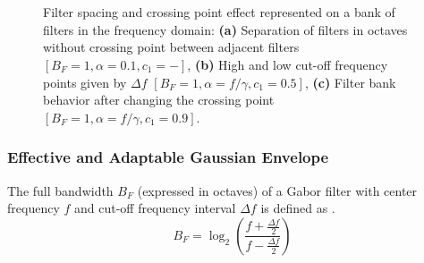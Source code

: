 \documentclass[journal]{IEEEtran}
\newcommand{\captext}[1]{\small{\textbf{\textsf{#1}}}}
\begin{document}
\begin{figure}[!ht]
\centering
     \\
    \\
\caption{Filter spacing and crossing point effect represented on a bank of filters in the frequency domain: \captext{(a)} Separation of filters in octaves without crossing point between adjacent filters $[B_F=1, \alpha=0.1, c_1=-]$, \captext{(b)} High and low cut-off frequency points given by $\Delta f$ $[B_F=1, \alpha=f/\gamma, c_1=0.5]$, \captext{(c)} Filter bank behavior after changing the crossing point $[B_F=1, \alpha=f/\gamma, c_1=0.9]$.}\label{fig:1d_filterbank_spacing}
\end{figure}


\subsubsection{Effective and Adaptable Gaussian Envelope}
The full bandwidth $B_F$ (expressed in octaves) of a Gabor filter with center frequency $f$ and cut-off frequency interval $\Delta f$ is defined as \cite{Daugman:JOSA:1985}.
\begin{equation}\label{eq:frequency_bandwidth_interval}
    B_F = \log_2 \left( \frac{f + \frac{\Delta f}{2} }{f - \frac{\Delta f}{2}} \right)
\end{equation}
\end{document}
